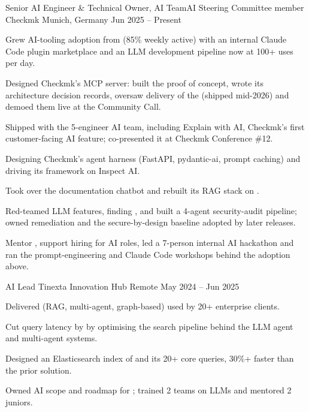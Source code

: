 
\begin{cventries}

  \joborrole
    {Senior AI Engineer \& Technical Owner, AI Team\enskip\textperiodcentered\enskip AI Steering Committee member}
    {Checkmk}
    {Munich, Germany}
    {Jun 2025 -- Present}
    {
      \item Grew AI-tooling adoption from  (85\% weekly active) with an internal Claude Code plugin marketplace and an LLM development pipeline now at 100+ uses per day.
      \item Designed Checkmk's MCP server: built the proof of concept, wrote its architecture decision records, oversaw delivery of the  (shipped mid-2026) and demoed them live at the Community Call.
      \item Shipped  with the 5-engineer AI team, including Explain with AI, Checkmk's first customer-facing AI feature; co-presented it at Checkmk Conference \#12.
      \item Designing Checkmk's agent harness (FastAPI, pydantic-ai, prompt caching) and driving its  framework on Inspect AI.
      \item Took over the documentation chatbot and rebuilt its RAG stack on .
      \item Red-teamed LLM features, finding , and built a 4-agent security-audit pipeline; owned remediation and the secure-by-design baseline adopted by later releases.
      \item Mentor , support hiring for AI roles, led a 7-person internal AI hackathon and ran the prompt-engineering and Claude Code workshops behind the adoption above.
    }

  \joborrole
    {AI Lead}
    {Tinexta Innovation Hub}
    {Remote}
    {May 2024 -- Jun 2025}
    {
      \item Delivered  (RAG, multi-agent, graph-based) used by 20+ enterprise clients.
      \item Cut query latency by  by optimising the search pipeline behind the LLM agent and multi-agent systems.
      \item Designed an Elasticsearch index of  and its 20+ core queries, 30\%+ faster than the prior solution.
      \item Owned AI scope and roadmap for ; trained 2 teams on LLMs and mentored 2 juniors.
    }


\end{cventries}
